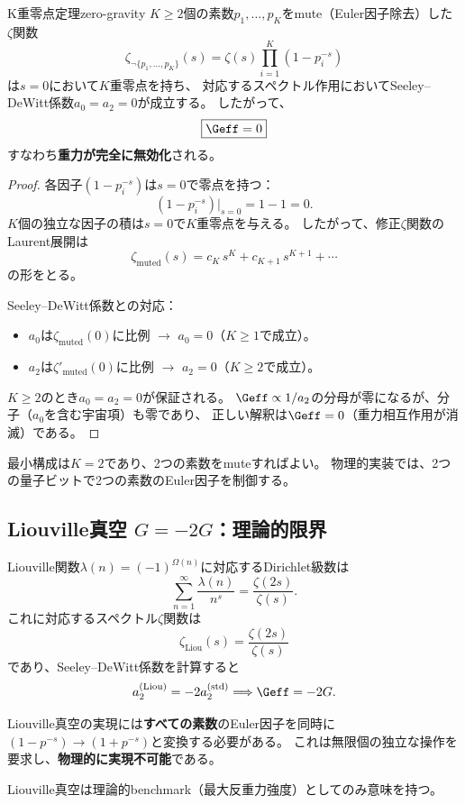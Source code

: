 \begin{keytheorem}{K重零点定理}{zero-gravity}
$K \geq 2$個の素数$p_1, \ldots, p_K$をmute（Euler因子除去）した
$\zeta$関数
\[
\zeta_{\neg\{p_1,\ldots,p_K\}}(s) = \zeta(s) \prod_{i=1}^{K} (1 - p_i^{-s})
\]
は$s = 0$において$K$重零点を持ち、
対応するスペクトル作用においてSeeley--DeWitt係数$a_0 = a_2 = 0$が成立する。
したがって、
\[
\boxed{\Geff = 0}
\]
すなわち\textbf{重力が完全に無効化}される。
\end{keytheorem}

\begin{proof}
各因子$(1 - p_i^{-s})$は$s = 0$で零点を持つ：
\[
(1 - p_i^{-s})\big|_{s=0} = 1 - 1 = 0.
\]
$K$個の独立な因子の積は$s=0$で$K$重零点を与える。
したがって、修正$\zeta$関数のLaurent展開は
\[
\zeta_{\text{muted}}(s) = c_K \, s^K + c_{K+1} \, s^{K+1} + \cdots
\]
の形をとる。

Seeley--DeWitt係数との対応：
\begin{itemize}
\item $a_0$は$\zeta_{\text{muted}}(0)$に比例 $\longrightarrow$ $a_0 = 0$（$K \geq 1$で成立）。
\item $a_2$は$\zeta'_{\text{muted}}(0)$に比例 $\longrightarrow$ $a_2 = 0$（$K \geq 2$で成立）。
\end{itemize}
$K \geq 2$のとき$a_0 = a_2 = 0$が保証される。
$\Geff \propto 1/a_2$の分母が零になるが、分子（$a_0$を含む宇宙項）も零であり、
正しい解釈は$\Geff = 0$（重力相互作用が消滅）である。\qedhere
\end{proof}

\begin{remark}
最小構成は$K = 2$であり、2つの素数をmuteすればよい。
物理的実装では、2つの量子ビットで2つの素数のEuler因子を制御する。
\end{remark}


\subsection{Liouville真空 $G = -2G$：理論的限界}
\label{sec:13.2}

Liouville関数$\lambda(n) = (-1)^{\Omega(n)}$に対応するDirichlet級数は
\[
\sum_{n=1}^{\infty} \frac{\lambda(n)}{n^s} = \frac{\zeta(2s)}{\zeta(s)}.
\]
これに対応するスペクトル$\zeta$関数は
\[
\zeta_{\text{Liou}}(s) = \frac{\zeta(2s)}{\zeta(s)}
\]
であり、Seeley--DeWitt係数を計算すると
\[
a_2^{(\text{Liou})} = -2 a_2^{(\text{std})}
\quad\Longrightarrow\quad
\Geff = -2G.
\]

\begin{tcolorbox}[colback=red!5!white, colframe=red!75!black, title=物理的実現不可能性]
Liouville真空の実現には\textbf{すべての素数}のEuler因子を同時に
$(1-p^{-s}) \to (1+p^{-s})$と変換する必要がある。
これは無限個の独立な操作を要求し、\textbf{物理的に実現不可能}である。

Liouville真空は理論的benchmark（最大反重力強度）としてのみ意味を持つ。
\end{tcolorbox}


